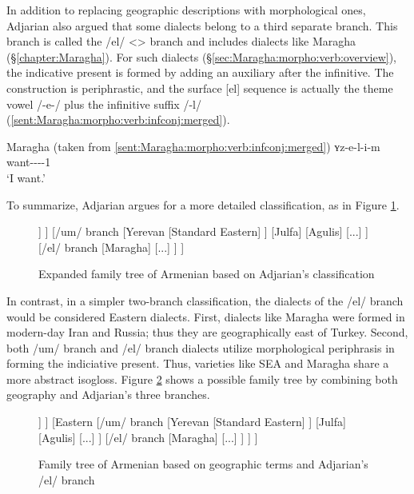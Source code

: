 In addition to replacing geographic descriptions with morphological ones, Adjarian also argued that some dialects belong to a third separate branch. This branch is called the /el/ <> branch and includes dialects like Maragha (\S\ref{chapter:Maragha}). For such dialects (\S\ref{sec:Maragha:morpho:verb:overview}), the indicative present is formed by adding an auxiliary after the infinitive. The construction is periphrastic, and the surface [el] sequence is actually the theme vowel /-e-/ plus the infinitive suffix /-l/ (\ref{sent:Maragha:morpho:verb:infconj:merged}). 

\begin{exe}
		\ex Maragha (taken from \ref{sent:Maragha:morpho:verb:infconj:merged})
	 \gll ʏz-e-l-i-m \\
			want-{\thgloss}-{\infgloss}-{\aux}-1{\sg} \\
			\trans `I want.'\\
			 \label{sent:Maragha:morpho:verb:infconj:merged REP in intro} 
			
	
\end{exe}

To summarize, Adjarian argues for a more detailed classification, as in Figure \ref{tree:dialect:adj}. 

\begin{figure}[H]
	\caption{Expanded family tree of Armenian based on Adjarian's classification}
	\label{tree:dialect:adj}
	\centering
	\begin{forest}
		[{Classical Armenian} [/kə/ branch [... ] [Trabzon ] [Crimea ] [Istanbul [{Standard Western}] ] ] [/um/ branch [Yerevan [{Standard Eastern}] ] [Julfa] [Agulis] [...] ] [/el/ branch [Maragha] [...] ] ]
	\end{forest}
	
\end{figure}

In contrast, in a simpler two-branch classification, the dialects of the /el/ branch would be considered Eastern dialects. First, dialects like Maragha were formed in modern-day Iran and Russia; thus they are geographically east of Turkey. Second, both /um/ branch and /el/ branch dialects utilize morphological periphrasis in forming the indiciative present. Thus, varieties like SEA and Maragha share a more abstract isogloss. Figure \ref{tree:dialect:compromise} shows a possible family tree by combining both geography and Adjarian's three branches. 

\begin{figure}[H]
	\caption{Family tree of Armenian based on geographic terms and Adjarian's /el/ branch}
	\label{tree:dialect:compromise}
	\centering
	\begin{forest}
		[{Classical Armenian} [{Western (/kə/ branch)} [... ] [Trabzon ] [Crimea ] [Istanbul [{Standard Western}] ] ] [Eastern [{/um/ branch} [Yerevan [{Standard Eastern}] ] [Julfa] [Agulis] [...] ] [/el/ branch [Maragha] [...] ] ] ]
	\end{forest}
	
\end{figure}
 
